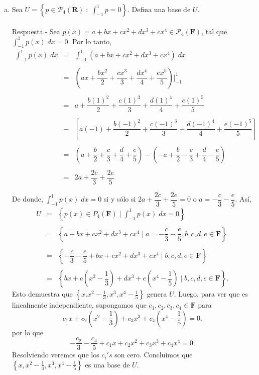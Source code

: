 \begin{enumerate}[\bfseries 1.]
\begin{enumerate}[(a)]
	    \item Sea $U=\left\{p\in \mathcal{P}_4(\textbf{R})\; : \; \int_{-1}^1 p=0\right\}$. Defina una base de $U$.\\\\
		Respuesta.-\; Sea $p(x)=a+bx+cx^2+dx^3+cx^4\in \mathcal{P}_4(\textbf{F})$, tal que $\int_{-1}^1 p(x)\; dx = 0.$
		Por lo tanto,
		$$
		\begin{array}{rcl}
		    \displaystyle\int_{-1}^1 p(x)\; dx &=& \displaystyle\int_{-1}^1 \left(a+bx+cx^2+dx^3+cx^4\right)\; dx\\\\
						       &=& \left(ax+\dfrac{bx^2}{2}+\dfrac{cx^3}{3}+\dfrac{dx^4}{4}+\dfrac{ex^5}{5}\right)\bigg|_{-1}^1\\\\
						       &=& a + \dfrac{b(1)^2}{2}+\dfrac{c(1)^3}{3}+\dfrac{d(1)^4}{4}+\dfrac{e(1)^5}{5} \\\\
						       &-& \left[a(-1) + \dfrac{b(-1)^2}{2}+\dfrac{c(-1)^3}{3}+\dfrac{d(-1)^4}{4}+\dfrac{e(-1)^5}{5}\right]\\\\
						       &=&\left(a+\dfrac{b}{2}+\dfrac{c}{3}+\dfrac{d}{4}+\dfrac{e}{5}\right)-\left(-a+\dfrac{b}{2}-\dfrac{c}{3}+\dfrac{d}{4}-\dfrac{e}{5}\right)\\\\
						       &=& 2a+\dfrac{2c}{3}+\dfrac{2e}{5}\\\\
		\end{array}
		$$
		De donde, $\int_{-1}^1 p(x)\; dx = 0$  si y sólo si $2a+\dfrac{2c}{3}+\dfrac{2e}{5}=0$ o $a=-\dfrac{c}{3}-\dfrac{e}{5}$. 
		Así, 
		$$
		\begin{array}{rcl}
		    U&=&\left\{p(x)\in  P_4(\textbf{F})\; \big| \; \displaystyle\int_{-1}^1 p(x)\; dx = 0\right\}\\\\
		     &=&\left\{a+bx+cx^2+dx^3+cx^4\; \big|\; a=-\dfrac{c}{3}-\dfrac{e}{5},b,c,d,e\in \textbf{F}\right\}\\\\
		     &=& \left\{-\dfrac{c}{3}-\dfrac{e}{5}+bx+cx^2+dx^3+cx^4\; \big|\; b,c,d,e\in \textbf{F}\right\}\\\\
		     &=& \left\{bx+c\left(x^2-\dfrac{1}{3}\right)+dx^3+e\left(x^4-\dfrac{1}{5}\right)\; \big|\; b,c,d,e\in \textbf{F}\right\}.
		\end{array}
		$$
		Esto demuestra que $\left\{x.x^2-\frac{1}{3},x^3,x^4-\frac{1}{5}\right\}$ genera $U$. Luego, para ver que es linealmente independiente, supongamos que $c_1,c_2,c_3,c_4\in \textbf{F}$ para
		$$c_1x+c_2\left(x^2-\dfrac{1}{3}\right)+c_3x^3+c_4\left(x^4-\dfrac{1}{5}\right)=0.$$
		por lo que
		$$-\dfrac{c_2}{3}-\dfrac{c_4}{5}+c_1x+c_2x^2+c_3x^3+c_4x^4=0.$$
		Resolviendo veremos que los $c_i's$ son cero. Concluimos que $\left\{x,x^2-\frac{1}{3},x^3,x^4-\frac{1}{5}\right\}$ es una base de $U$.\\\\


\end{enumerate}
\end{enumerate}
